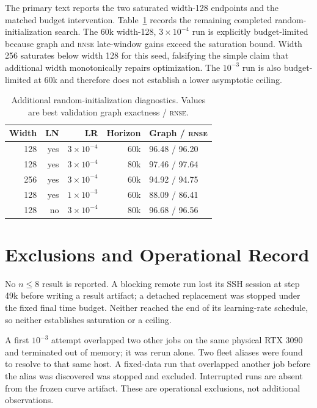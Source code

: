 \documentclass[10pt,twocolumn]{article}
\newcommand{\rnse}{\textsc{rnse}}
\begin{document}
The primary text reports the two saturated width-128 endpoints and the matched
budget intervention. Table~\ref{tab:additional} records the remaining
completed random-initialization search. The 60k width-128,
\(3\times10^{-4}\) run is explicitly budget-limited because graph and \rnse{}
late-window gains exceed the saturation bound. Width 256 saturates below width
128 for this seed, falsifying the simple claim that additional width
monotonically repairs optimization. The \(10^{-3}\) run is also budget-limited
at 60k and therefore does not establish a lower asymptotic ceiling.

\begin{table}[ht]
\centering
\caption{Additional random-initialization diagnostics. Values are best
validation graph exactness / \rnse{}.}
\label{tab:additional}
\small
\begin{tabular}{rrrrl}
\toprule
Width & LN & LR & Horizon & Graph / \rnse{} \\
\midrule
128 & yes & \(3{\times}10^{-4}\) & 60k & 96.48 / 96.20 \\
128 & yes & \(3{\times}10^{-4}\) & 80k & 97.46 / 97.64 \\
256 & yes & \(3{\times}10^{-4}\) & 60k & 94.92 / 94.75 \\
128 & yes & \(1{\times}10^{-3}\) & 60k & 88.09 / 86.41 \\
128 & no  & \(3{\times}10^{-4}\) & 80k & 96.68 / 96.56 \\
\bottomrule
\end{tabular}
\end{table}

\section{Exclusions and Operational Record}

No \(n\le8\) result is reported. A blocking remote run lost its SSH session at
step 49k before writing a result artifact; a detached replacement was stopped
under the fixed final time budget. Neither reached the end of its learning-rate
schedule, so neither establishes saturation or a ceiling.

A first \(10^{-3}\) attempt overlapped two other jobs on the same physical RTX
3090 and terminated out of memory; it was rerun alone. Two fleet aliases were
found to resolve to that same host. A fixed-data run that overlapped another
job before the alias was discovered was stopped and excluded. Interrupted
runs are absent from the frozen curve artifact. These are operational
exclusions, not additional observations.
\end{document}
